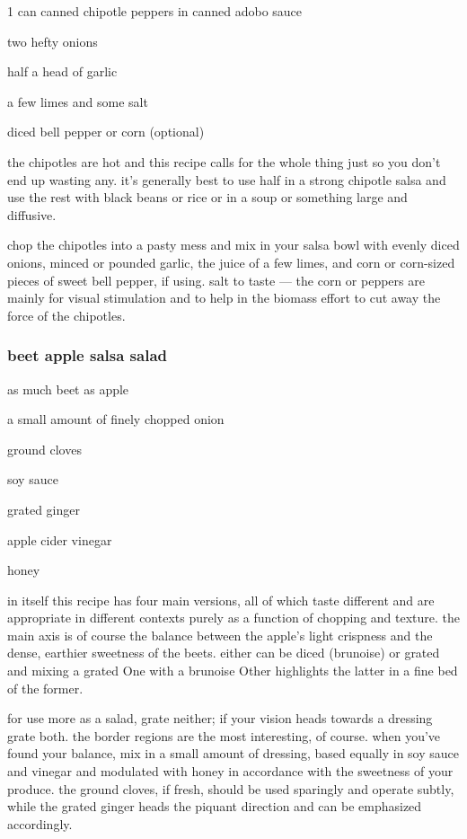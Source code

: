 \begin{ingredients}
  \item 1 can canned chipotle peppers in canned adobo sauce
  \item two hefty onions
  \item half a head of garlic
  \item a few limes and some salt
  \item diced bell pepper or corn (optional)
\end{ingredients}

the chipotles are hot and this recipe calls for the whole thing just
so you don't end up wasting any. it's generally best to use half in a
strong chipotle salsa and use the rest with black beans or rice or in
a soup or something large and diffusive.

chop the chipotles into a pasty mess and mix in your salsa bowl with
evenly diced onions, minced or pounded garlic, the juice of a few
limes, and corn or corn-sized pieces of sweet bell pepper, if
using. salt to taste --- the corn or peppers are mainly for visual
stimulation and to help in the biomass effort to cut away the force of
the chipotles.

\subsubsection{beet apple salsa salad}

\begin{ingredients}
  \item as much beet as apple
  \item a small amount of finely chopped onion
  \item ground cloves
  \item soy sauce
  \item grated ginger
  \item apple cider vinegar
  \item honey
\end{ingredients}

in itself this recipe has four main versions, all of which taste
different and are appropriate in different contexts purely as a
function of chopping and texture. the main axis is of course the
balance between the apple's light crispness and the dense, earthier
sweetness of the beets. either can be diced (brunoise) or grated and
mixing a grated One with a brunoise Other highlights the latter in a
fine bed of the former.

for use more as a salad, grate neither; if your vision heads towards a
dressing grate both. the border regions are the most interesting, of
course. when you've found your balance, mix in a small amount of
dressing, based equally in soy sauce and vinegar and modulated with
honey in accordance with the sweetness of your produce. the ground
cloves, if fresh, should be used sparingly and operate subtly, while
the grated ginger heads the piquant direction and can be emphasized
accordingly.

